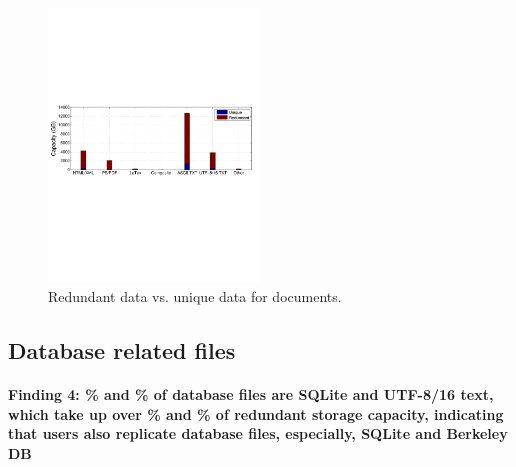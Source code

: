 \begin{figure}
	\centering
	\includegraphics[width=0.5\textwidth]{graphs/type-utili-cap}
	\caption{Redundant data vs. unique data for documents.
	}
	\label{fig:type-doc}
\end{figure}


\subsection{Database related files}
\paragraph{Finding 4: \% and \% of database files are SQLite and UTF-8/16 text, which take up over \% and \% of redundant storage capacity, indicating that users also replicate database files, especially, SQLite and Berkeley DB}

